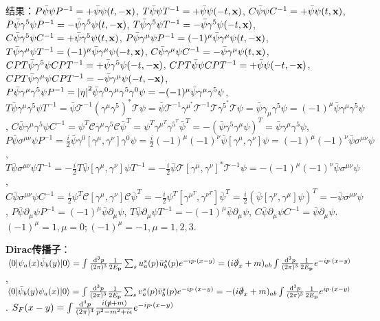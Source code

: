 \documentclass[11pt]{article}
\newcommand{\intphead}[1]{\int\frac{\dd^3#1}{(2\pi)^3}}
\newcommand{\gm}{\gamma^{\mu}}
\newcommand{\gn}{\gamma^{\nu}}
\newcommand{\vbp}{\vb{p}}
\newcommand{\g}{\gamma}
\newcommand{\s}{\sigma}
\newcommand{\pars}{\slashed\partial}
\newcommand{\ps}{\slashed p}
\newcommand{\Tscr}{\mathscr{T}}
\newcommand{\Cscr}{\mathscr{C}}
\begin{document}
结果：$P\bar\psi\psi P^{-1}=+\bar\psi\psi(t, -\vb{x})$,
$T\bar\psi\psi T^{-1}=+\bar\psi\psi(-t, \vb{x})$,
$C\bar\psi\psi C^{-1}=+\bar\psi\psi(t, \vb{x})$,
$P\bar\psi\g^5\psi P^{-1}=-\bar\psi\g^5\psi(t, -\vb{x})$,
$T\bar\psi\g^5\psi T^{-1}=-\bar\psi\g^5\psi(-t, \vb{x})$,
$C\bar\psi\g^5\psi C^{-1}=+\bar\psi\g^5\psi(t, \vb{x})$,
$P\bar\psi\gm\psi P^{-1}=(-1)^{\mu}\bar\psi\gm\psi(t, -\vb{x})$,
$T\bar\psi\gm\psi T^{-1}=(-1)^{\mu}\bar\psi\gm\psi(-t, \vb{x})$,
$C\bar\psi\gm\psi C^{-1}=-\bar\psi\gm\psi(t, \vb{x})$,
$CPT\bar\psi\g^5\psi CPT^{-1}=+\bar\psi\g^5\psi(-t, -\vb{x})$,
$CPT\bar\psi\psi CPT^{-1}=+\bar\psi\psi(-t, -\vb{x})$,
$CPT\bar\psi\gm\psi CPT^{-1}=-\bar\psi\gm\psi(-t, -\vb{x})$,
$P\bar\psi\gm\g^5\psi P^{-1}=\abs{\eta}^2\bar\psi\g^0\gm\g^5\g^0\psi=-(-1)^{\mu}\bar\psi\gm\g^5\psi$,
$T\bar\psi\gm\g^5\psi T^{-1}=\bar\psi\Tscr^{-1}(\gm\g^5)^*\Tscr\psi=\bar\psi\Tscr^{-1}\gm^*\Tscr^{-1}\Tscr\g^5^*\Tscr\psi=\bar\psi\g_{\mu}\g^5\psi=(-1)^{\mu}\bar\psi\gm\g^5\psi$,
$C\bar\psi\gm\g^5\psi C^{-1}=\psi^T\Cscr\gm\g^5\Cscr\bar\psi^T=\psi^T\gm^T\g^5^T\bar\psi^T=-(\bar\psi\g^5\gm\psi)^T=\bar\psi\gm\g^5\psi$,
$P\bar\psi\s^{\mu\nu}\psi P^{-1}=\frac{i}{2}\bar\psi\g^0[\gm,\gn]\g^0\psi=\frac{i}{2}(-1)^{\mu}(-1)^{\nu}\bar\psi[\g^{\mu},\gn]\psi=(-1)^{\mu}(-1)^{\nu}\bar\psi\s^{\mu\nu}\psi$,
$T\bar\psi\s^{\mu\nu}\psi T^{-1}=-\frac{i}{2}T\bar\psi[\gm,\gn]\psi T^{-1}=-\frac{i}{2}\bar\psi\Tscr[\gm,\gn]^*\Tscr^{-1}\psi=-(-1)^{\mu}(-1)^{\nu}\bar\psi\s^{\mu\nu}\psi$,
$C\bar\psi\s^{\mu\nu}\psi C^{-1}=\frac{i}{2}\psi^T\Cscr[\gm,\gn]\Cscr\bar\psi^T=-\frac{i}{2}\psi^T[\gm^T,\gn^T]\bar\psi^T=\frac{i}{2}(\bar\psi[\gn,\gm]\psi)^T=-\bar\psi\s^{\mu\nu}\psi$,
$P\bar\psi\partial_{\mu}\psi P^{-1}=(-1)^{\mu}\bar\psi\partial_{\mu}\psi$,
$T\bar\psi\partial_{\mu}\psi T^{-1}=-(-1)^{\mu}\bar\psi\partial_{\mu}\psi$,
$C\bar\psi\partial_{\mu}\psi C^{-1}=\bar\psi\partial_{\mu}\psi$.
$(-1)^{\mu}=1,\mu=0;(-1)^{\mu}=-1,\mu=1,2,3$.

{\bf Dirac传播子}：$\mel{0}{\psi_a(x)\bar\psi_b(y)}{0}=\intphead{p}\frac{1}{2E_{\vbp}}\sum_su^s_a(p)\bar u^s_b(p)e^{-ip\cdot(x-y)}=(i\pars_x+m)_{ab}\intphead{p}\frac{1}{2E_{\vbp}}e^{-ip\cdot(x-y)}$,
$\mel{0}{\bar\psi_b(y)\psi_a(x)}{0}=\intphead{p}\frac{1}{2E_{\vbp}}\sum_sv^s_a(p)\bar v^s_b(p)e^{-ip\cdot(x-y)}=-(i\pars_x+m)_{ab}\intphead{p}\frac{1}{2E_{\vbp}}e^{ip\cdot(x-y)}$.
$S_F(x-y)=\int\frac{\dd^4p}{(2\pi)^4}\frac{i(\ps+m)}{p^2-m^2+i\epsilon}e^{-ip\cdot(x-y)}$
\end{document}
